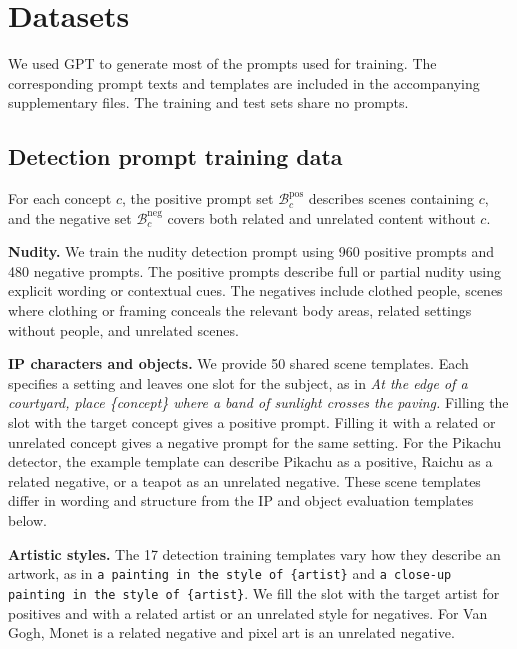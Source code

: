 \clearpage
\setcounter{page}{1}
\maketitlesupplementary

\section{Datasets}
\label{sec:suppl_datasets}

We used GPT to generate most of the prompts used for training. 
The corresponding prompt texts and templates are included in the accompanying supplementary files. 
The training and test sets share no prompts.

\subsection{Detection prompt training data}
\label{sec:suppl_detection_data}

For each concept $c$, the positive prompt set $\mathcal B_c^{\mathrm{pos}}$ describes scenes containing 
$c$, and the negative set $\mathcal B_c^{\mathrm{neg}}$ covers both related and unrelated content 
without $c$. 

\noindent\textbf{Nudity.}
We train the nudity detection prompt using 960 positive prompts and 480 negative prompts. 
The positive prompts describe full or partial nudity using explicit wording or contextual cues. 
The negatives include clothed people, scenes where clothing or framing conceals the relevant body areas, 
related settings without people, and unrelated scenes.

\noindent\textbf{IP characters and objects.}
We provide 50 shared scene templates. Each specifies a setting and leaves one slot for the subject, as in \emph{At the edge of a courtyard, place \{concept\} where a band of sunlight crosses the paving.} Filling the slot with the target concept gives a positive prompt. Filling it with a related or unrelated concept gives a negative prompt for the same setting. For the Pikachu detector, the example template can describe Pikachu as a positive, Raichu as a related negative, or a teapot as an unrelated negative. These scene templates differ in wording and structure from the IP and object evaluation templates below.

\noindent\textbf{Artistic styles.}
The 17 detection training templates vary how they describe an artwork, as in \texttt{a painting in the style of \{artist\}} and \texttt{a close-up painting in the style of \{artist\}}. We fill the slot with the target artist for positives and with a related artist or an unrelated style for negatives. For Van Gogh, Monet is a related negative and pixel art is an unrelated negative.


